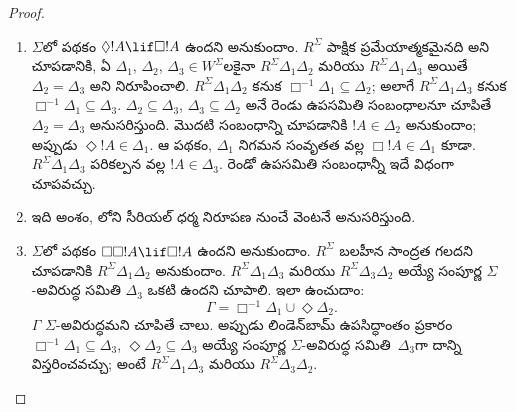 \documentclass[../../../include/open-logic-section]{subfiles}
\begin{document}
\begin{proof}
  \begin{enumerate}
  \item $\Sigma$లో పథకం $\Diamond !A \lif \Box !A$
    ఉందని అనుకుందాం. $R^\Sigma$ పాక్షిక ప్రమేయాత్మకమైనది
    అని చూపడానికి, ఏ $\Delta_1$, $\Delta_2$, $\Delta_3 \in
    W^\Sigma$లకైనా $R^\Sigma \Delta_1\Delta_2$ మరియు
    $R^\Sigma \Delta_1\Delta_3$ అయితే $\Delta_2=\Delta_3$
    అని నిరూపించాలి. $R^\Sigma \Delta_1\Delta_2$ కనుక
    $\Box^{-1}\Delta_1 \subseteq \Delta_2$; అలాగే
    $R^\Sigma \Delta_1\Delta_3$ కనుక
    $\Box^{-1}\Delta_1 \subseteq \Delta_3$.
    $\Delta_2 \subseteq \Delta_3$, $\Delta_3 \subseteq
    \Delta_2$ అనే రెండు ఉపసమితి సంబంధాలనూ చూపితే
    $\Delta_2=\Delta_3$ అనుసరిస్తుంది. మొదటి సంబంధాన్ని చూపడానికి
    $!A \in \Delta_2$ అనుకుందాం; అప్పుడు $\Diamond!A
    \in \Delta_1$. ఆ పథకం, $\Delta_1$ నిగమన సంవృతత వల్ల
    $\Box!A \in \Delta_1$ కూడా. $R^\Sigma
    \Delta_1\Delta_3$ పరికల్పన వల్ల $!A \in \Delta_3$.
    రెండో ఉపసమితి సంబంధాన్నీ ఇదే విధంగా చూపవచ్చు.

  \item ఇది  అంశం,
    లోని సీరియల్ ధర్మ నిరూపణ
    నుంచే వెంటనే అనుసరిస్తుంది.

    \item $\Sigma$లో పథకం $\Box\Box!A \lif \Box!A$
    ఉందని అనుకుందాం. $R^\Sigma$ బలహీన సాంద్రత గలదని
    చూపడానికి $R^\Sigma \Delta_1\Delta_2$ అనుకుందాం.
    $R^\Sigma \Delta_1\Delta_3$ మరియు $R^\Sigma
    \Delta_3\Delta_2$ అయ్యే సంపూర్ణ $\Sigma$-అవిరుద్ధ
    సమితి $\Delta_3$ ఒకటి ఉందని చూపాలి. ఇలా ఉంచుదాం:
    \[
    \Gamma = \Box^{-1}\Delta_1 \cup \Diamond\Delta_2.
    \]
    $\Gamma$ $\Sigma$-అవిరుద్ధమని చూపితే చాలు. అప్పుడు
    లిండెన్‌బామ్ ఉపసిద్ధాంతం ప్రకారం $\Box^{-1}\Delta_1
    \subseteq \Delta_3$, $\Diamond\Delta_2 \subseteq
    \Delta_3$ అయ్యే సంపూర్ణ $\Sigma$-అవిరుద్ధ
    సమితి~$\Delta_3$గా దాన్ని విస్తరించవచ్చు; అంటే
    $R^\Sigma \Delta_1\Delta_3$ మరియు
    $R^\Sigma \Delta_3\Delta_2$.


\end{enumerate}
\end{proof}
\end{document}
